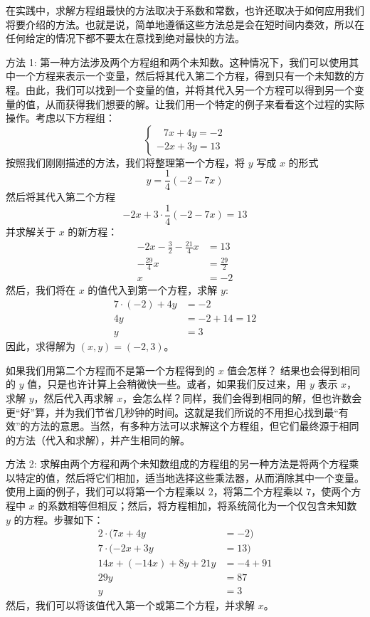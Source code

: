 在实践中，求解方程组最快的方法取决于系数和常数，也许还取决于如何应用我们将要介绍的方法。也就是说，简单地遵循这些方法总是会在短时间内奏效，所以在任何给定的情况下都不要太在意找到绝对最快的方法。

\begin{method}{方法 1: }
    第一种方法涉及两个方程组和两个未知数。这种情况下，我们可以使用其中一个方程来表示一个变量，然后将其代入第二个方程，得到只有一个未知数的方程。由此，我们可以找到一个变量的值，并将其代入另一个方程可以得到另一个变量的值，从而获得我们想要的解。让我们用一个特定的例子来看看这个过程的实际操作。考虑以下方程组：
    $$
    \begin{cases}
        \enspace\: 7x+4y =-2 \\
        -2x+3y =13
    \end{cases}
    $$
    按照我们刚刚描述的方法，我们将整理第一个方程，将 $y$ 写成 $x$ 的形式
    \[y = \frac{1}{4}(-2-7x)\]
    然后将其代入第二个方程
    \[-2x + 3 \cdot \frac{1}{4}(-2 - 7x) = 13\]
    并求解关于 $x$ 的新方程：
    \begin{align*}
        -2x-\frac{3}{2}-\frac{21}{4}x &= 13 \\
        -\frac{29}{4}x &= \frac{29}{2} \\
        x &= -2
    \end{align*}
    然后，我们将在 $x$ 的值代入到第一个方程，求解 $y$: 
    \begin{align*}
        7 \cdot (-2) + 4y &= -2 \\
        4y &= -2+14 = 12 \\
        y &= 3
    \end{align*}
    因此，求得解为 $(x, y) = (-2, 3)$。
\end{method}

如果我们用第二个方程而不是第一个方程得到的 $x$ 值会怎样？ 结果也会得到相同的 $y$ 值，只是也许计算上会稍微快一些。或者，如果我们反过来，用 $y$ 表示 $x$，求解 $y$，然后代入再求解 $x$，会怎么样？同样，我们会得到相同的解，但也许数会更``好''算，并为我们节省几秒钟的时间。这就是我们所说的不用担心找到最``有效''的方法的意思。当然，有多种方法可以求解这个方程组，但它们最终源于相同的方法（代入和求解），并产生相同的解。

\begin{method}{方法 2: }
    求解由两个方程和两个未知数组成的方程组的另一种方法是将两个方程乘以特定的值，然后将它们相加，适当地选择这些乘法器，从而消除其中一个变量。使用上面的例子，我们可以将第一个方程乘以 $2$，将第二个方程乘以 $7$，使两个方程中 $x$ 的系数相等但相反；然后，将方程相加，将系统简化为一个仅包含未知数 $y$ 的方程。步骤如下：
    \begin{align*}
        2 \cdot (7x+4y &= -2) \\ 
        7 \cdot (-2x+3y &=13) \\
        14x + (-14x) + 8y + 21y &= -4 + 91 \\
        29y &= 87 \\
        y &= 3
    \end{align*}
    然后，我们可以将该值代入第一个或第二个方程，并求解 $x$。
\end{method}

